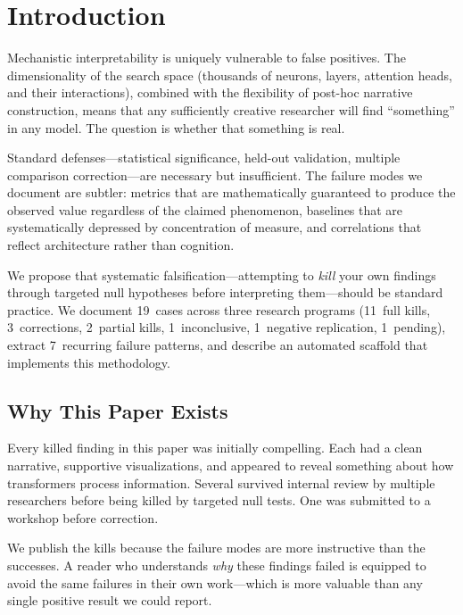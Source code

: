 \documentclass[11pt,a4paper]{article}
\begin{document}
\section{Introduction}
\label{sec:introduction}

Mechanistic interpretability is uniquely vulnerable to false positives.
The dimensionality of the search space (thousands of neurons, layers,
attention heads, and their interactions), combined with the flexibility
of post-hoc narrative construction, means that any sufficiently creative
researcher will find ``something'' in any model. The question is whether
that something is real.

Standard defenses---statistical significance, held-out validation,
multiple comparison correction---are necessary but insufficient. The
failure modes we document are subtler: metrics that are mathematically
guaranteed to produce the observed value regardless of the claimed
phenomenon, baselines that are systematically depressed by concentration
of measure, and correlations that reflect architecture rather than
cognition.

We propose that systematic falsification---attempting to \emph{kill}
your own findings through targeted null hypotheses before interpreting
them---should be standard practice. We document 19~cases across three
research programs (11~full kills, 3~corrections, 2~partial kills,
1~inconclusive, 1~negative replication, 1~pending), extract 7~recurring
failure patterns, and describe an automated scaffold that implements
this methodology.

\subsection{Why This Paper Exists}

Every killed finding in this paper was initially compelling. Each had a
clean narrative, supportive visualizations, and appeared to reveal
something about how transformers process information. Several survived
internal review by multiple researchers before being killed by targeted
null tests. One was submitted to a workshop before correction.

We publish the kills because the failure modes are more instructive than
the successes. A reader who understands \emph{why} these findings failed
is equipped to avoid the same failures in their own work---which is more
valuable than any single positive result we could report.
\end{document}
